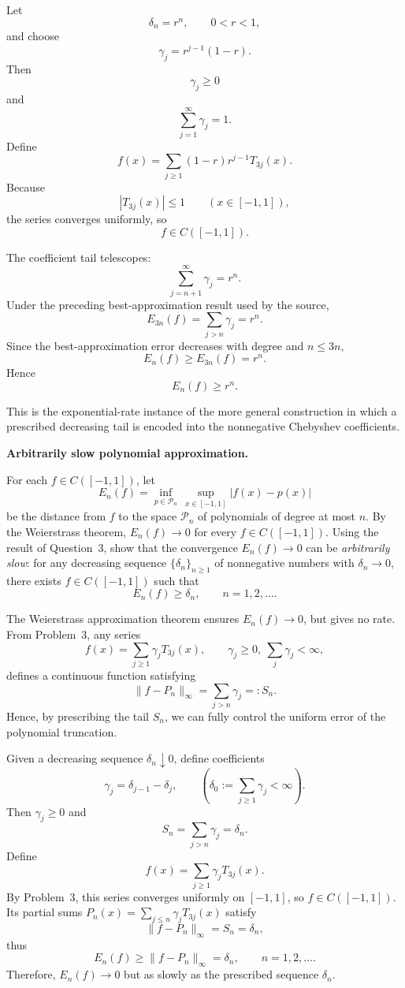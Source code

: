 \begin{solution}
Let
\[
\delta_n=r^n,
\qquad
0<r<1,
\]
and choose
\[
\gamma_j
=
r^{j-1}(1-r).
\]
Then
\[
\gamma_j\ge0
\]
and
\[
\sum_{j=1}^{\infty}\gamma_j=1.
\]
Define
\[
f(x)
=
\sum_{j\ge1}
(1-r)r^{j-1}T_{3j}(x).
\]
Because
\[
|T_{3j}(x)|\le1
\qquad(x\in[-1,1]),
\]
the series converges uniformly, so
\[
f\in C([-1,1]).
\]

The coefficient tail telescopes:
\[
\sum_{j=n+1}^{\infty}\gamma_j
=
r^n.
\]
Under the preceding best-approximation result used by the source,
\[
E_{3n}(f)
=
\sum_{j>n}\gamma_j
=
r^n.
\]
Since the best-approximation error decreases with degree and \(n\le3n\),
\[
E_n(f)
\ge
E_{3n}(f)
=
r^n.
\]
Hence
\[
\boxed{
E_n(f)\ge r^n.
}
\]

This is the exponential-rate instance of the more general construction in which a prescribed
decreasing tail is encoded into the nonnegative Chebyshev coefficients.
\end{solution}


\begin{problem}[CP-II-0076]
\label{prob:cp-ii-0076}
\textbf{Arbitrarily slow polynomial approximation.}

\hspace*{1.5em}For each $f\in C([-1,1])$, let
\[
E_n(f)=\inf_{p\in\mathcal{P}_n}\,\sup_{x\in[-1,1]}|f(x)-p(x)|
\]
be the distance from $f$ to the space $\mathcal{P}_n$ of polynomials of degree at most $n$.
By the Weierstrass theorem, $E_n(f)\to0$ for every $f\in C([-1,1])$.
Using the result of Question~3, show that the convergence $E_n(f)\to0$
can be \emph{arbitrarily slow}: for any decreasing sequence
$\{\delta_n\}_{n\ge1}$ of nonnegative numbers with $\delta_n\to0$,
there exists $f\in C([-1,1])$ such that
\[
E_n(f)\ge\delta_n,\qquad n=1,2,\dots.
\]

The Weierstrass approximation theorem ensures $E_n(f)\to0$, but gives no rate.
From Problem~3, any series
\[
f(x)=\sum_{j\ge1}\gamma_j T_{3j}(x), \qquad \gamma_j\ge0,\ \sum_{j}\gamma_j<\infty,
\]
defines a continuous function satisfying
\[
\|f-P_n\|_\infty=\sum_{j>n}\gamma_j=:S_n.
\]
Hence, by prescribing the tail $S_n$, we can fully control the uniform error of the
polynomial truncation.
\end{problem}

\begin{solution}
Given a decreasing sequence $\delta_n\downarrow0$, define coefficients
\[
\gamma_j=\delta_{j-1}-\delta_j, \qquad (\delta_0:=\sum_{j\ge1}\gamma_j<\infty).
\]
Then $\gamma_j\ge0$ and
\[
S_n=\sum_{j>n}\gamma_j=\delta_n.
\]
Define
\[
f(x)=\sum_{j\ge1}\gamma_j T_{3j}(x).
\]
By Problem~3, this series converges uniformly on $[-1,1]$,
so $f\in C([-1,1])$.
Its partial sums $P_n(x)=\sum_{j\le n}\gamma_jT_{3j}(x)$ satisfy
\[
\|f-P_n\|_\infty=S_n=\delta_n,
\]
thus
\[
E_n(f)\ge\|f-P_n\|_\infty=\delta_n,\qquad n=1,2,\dots.
\]
Therefore, $E_n(f)\to0$ but as slowly as the prescribed sequence $\delta_n$.
\end{solution}

